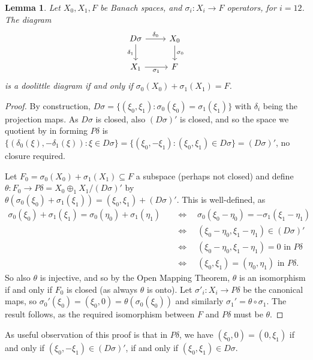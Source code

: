 \documentclass[a4paper,11pt]{article}
\theoremstyle{plain}
\newtheorem{lemma}[proposition]{Lemma}
\theoremstyle{remark}
\newenvironment{remark}
  {\pushQED{\qed}\renewcommand{\qedsymbol}{$\triangle$}\remarkx}
  {\popQED\endremarkx}
\begin{document}
\begin{lemma}\label{lem:when_doolittle_from_pullback}
Let $X_0, X_1, F$ be Banach spaces, and $\sigma_i\colon X_i\to F$ operators, for $i=12$.  The diagram
\[ \begin{tikzcd}
D\sigma \arrow[r, "\delta_0"] \arrow[d, "\delta_1"'] & X_0 \arrow[d, "\sigma_0"] \\
X_1 \arrow[r, "\sigma_1"'] & F
\end{tikzcd} \]
is a doolittle diagram if and only if $\sigma_0(X_0) + \sigma_1(X_1) = F$.
\end{lemma}
\begin{proof}
By construction, $D\sigma = \{ (\xi_0,\xi_1) : \sigma_0(\xi_0) = \sigma_1(\xi_1) \}$ with $\delta_i$ being the projection maps.  As $D\sigma$ is closed, also $(D\sigma)'$ is closed, and so the space we quotient by in forming $P\delta$ is $\{ (\delta_0(\xi), -\delta_1(\xi)) : \xi\in D\sigma \} = \{ (\xi_0, -\xi_1) : (\xi_0,\xi_1) \in D\sigma \} = (D\sigma)'$, no closure required.

Let $F_0 = \sigma_0(X_0) + \sigma_1(X_1) \subseteq F$ a subspace (perhaps not closed) and define $\theta \colon F_0 \to P\delta =  X_0 \oplus_1 X_1 / (D\sigma)'$ by $\theta(\sigma_0(\xi_0) + \sigma_1(\xi_1)) = (\xi_0, \xi_1) + (D\sigma)'$.  This is well-defined, as
\begin{align*}
\sigma_0(\xi_0) + \sigma_1(\xi_1) = \sigma_0(\eta_0) + \sigma_1(\eta_1)
\quad&\Leftrightarrow\quad  \sigma_0(\xi_0-\eta_0) = -\sigma_1(\xi_1-\eta_1)  \\
&\Leftrightarrow\quad  (\xi_0-\eta_0, \xi_1-\eta_1) \in (D\sigma)'   \\
&\Leftrightarrow\quad  (\xi_0-\eta_0, \xi_1-\eta_1) = 0 \text{ in } P\delta   \\
&\Leftrightarrow\quad  (\xi_0, \xi_1) = (\eta_0, \eta_1) \text{ in } P\delta.
\end{align*}
So also $\theta$ is injective, and so by the Open Mapping Theorem, $\theta$ is an isomorphism if and only if $F_0$ is closed (as always $\theta$ is onto).  Let $\sigma'_i \colon X_i \to P\delta$ be the canonical maps, so $\sigma_0'(\xi_0) = (\xi_0,0) = \theta(\sigma_0(\xi_0))$ and similarly $\sigma_1' = \theta\circ\sigma_1$.  The result follows, as the required isomorphism between $F$ and $P\delta$ must be $\theta$.
\end{proof}

\begin{remark}\label{rem:when_equal_in_sigma}
As useful observation of this proof is that in $P\delta$, we have $(\xi_0,0) = (0,\xi_1)$ if and only if $(\xi_0, -\xi_1) \in (D\sigma)'$, if and only if $(\xi_0, \xi_1) \in D\sigma$.
\end{remark}
\end{document}
